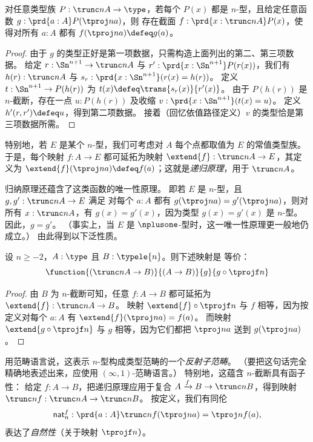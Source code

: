\begin{thm}\label{thm:truncn-ind}
  对任意类型族 $P:\trunc n A \to \type$，若每个 $P(x)$ 都是 $n$-型，且给定任意函数 $g : \prd{a:A} P(\tproj n a)$，则
存在截面 $f:\prd{x:\trunc n A} P(x)$，使得对所有 $a:A$ 都有 $f(\tproj n a)\defeq g(a)$。
\end{thm}
\begin{proof}
  由于 $g$ 的类型正好是第一项数据，只需构造上面列出的第二、第三项数据。
  给定 $r:\Sn^{n+1} \to \trunc n A$ 与 $r':\prd{x:\Sn^{n+1}} P(r(x))$，我们有 $h(r):\trunc n A$ 与 $s_r :\prd{x:\Sn^{n+1}} (r(x) =
h(r))$。
  定义 $t:\Sn^{n+1} \to P(h(r))$ 为 $t(x) \defeq \trans{s_r(x)}{r'(x)}$。
  由于 $P(h(r))$ 是 $n$-截断，存在一点 $u:P(h(r))$ 及收缩 $v:\prd{x:\Sn^{n+1}} (t(x) = u)$。
  定义 $h'(r,r') \defeq u$，得到第二项数据。
  接着（回忆依值路径定义）$v$ 的类型恰是第三项数据所需。
\end{proof}

特别地，若 $E$ 是某个 $n$-型，我们可考虑对 $A$ 每个点都取值为 $E$ 的常值类型族。
%
于是，每个映射 $f:A\to{}E$ 都可延拓为映射 $\extend{f}:\trunc nA\to{}E$，其定义为 $\extend{f}(\tproj na)\defeq f(a)$；这就是\emph{递归原理}，用于 $\trunc n A$。

归纳原理还蕴含了这类函数的唯一性原理。
%
即若 $E$ 是 $n$-型，且 $g,g':\trunc nA\to{}E$ 满足
对每个 $a:A$ 都有 $g(\tproj na)=g'(\tproj na)$，则对所有 $x:\trunc nA$，有 $g(x)=g'(x)$，因为类型 $g(x)=g'(x)$ 是 $n$-型。
因此，$g=g'$。
（事实上，当 $E$ 是 $\nplusone$-型时，这一唯一性原理更一般地仍成立。）
由此得到以下泛性质。

\begin{lem}[截断的泛性质]\label{thm:trunc-reflective}
  设 $n\ge-2$，$A:\type$ 且 $B:\typele{n}$。则下述映射是
  等价：
  \[\function{(\trunc nA\to{}B)}{(A\to{}B)}{g}{g\circ\tprojf n}\]
\end{lem}

\begin{proof}
  由 $B$ 为 $n$-截断可知，任意 $f:A\to{}B$ 都可延拓为 $\extend{f}:\trunc nA\to{}B$。
  映射 $\extend{f}\circ\tprojf n$ 与 $f$ 相等，因为按定义对每个 $a:A$ 有 $\extend{f}(\tproj na)=f(a)$。
  而映射 $\extend{g\circ\tprojf n}$ 与 $g$ 相等，因为它们都把 $\tproj na$ 送到 $g(\tproj na)$。
\end{proof}

用范畴语言说，这表示 $n$-型构成类型范畴的一个\emph{反射子范畴}。
%
（要把这句话完全精确地表述出来，应使用 $(\infty,1)$-范畴语言。）
%
特别地，这蕴含 $n$-截断具有函子性：
给定 $f:A\to B$，把递归原理应用于复合 $A\xrightarrow{f} B \to \trunc n B$，得到映射 $\trunc n f: \trunc n A \to \trunc n B$。
按定义，我们有同伦
\begin{equation}
  \mathsf{nat}^f_n : \prd{a:A} \trunc n f(\tproj n a) = \tproj n {f(a)},\label{eq:trunc-nat}
\end{equation}
表达了\emph{自然性}（关于映射 $\tprojf n$）。


